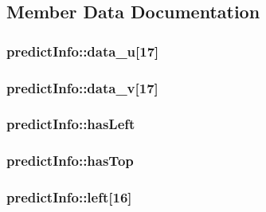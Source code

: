 \subsection{Member Data Documentation}
\hypertarget{structpredict_info_a4bb62e14becc6e2eeac45bc8d6a66688}{
\subsubsection[{data\_\-u}]{ {\bf predictInfo::data\_\-u}\mbox{[}17\mbox{]}}}
\label{structpredict_info_a4bb62e14becc6e2eeac45bc8d6a66688}
\hypertarget{structpredict_info_ad302972bab20c3c3c87ce4a25efd17a3}{
\subsubsection[{data\_\-v}]{ {\bf predictInfo::data\_\-v}\mbox{[}17\mbox{]}}}
\label{structpredict_info_ad302972bab20c3c3c87ce4a25efd17a3}
\hypertarget{structpredict_info_abe5b70fdeb86bc2d99d9c3e65250fa8e}{
\subsubsection[{hasLeft}]{ {\bf predictInfo::hasLeft}}}
\label{structpredict_info_abe5b70fdeb86bc2d99d9c3e65250fa8e}
\hypertarget{structpredict_info_a63e51107c5058064b6e8bc3fd6a08b46}{
\subsubsection[{hasTop}]{ {\bf predictInfo::hasTop}}}
\label{structpredict_info_a63e51107c5058064b6e8bc3fd6a08b46}
\hypertarget{structpredict_info_aaec86d32b8769dabe17f60051a792e19}{
\subsubsection[{left}]{ {\bf predictInfo::left}\mbox{[}16\mbox{]}}}
